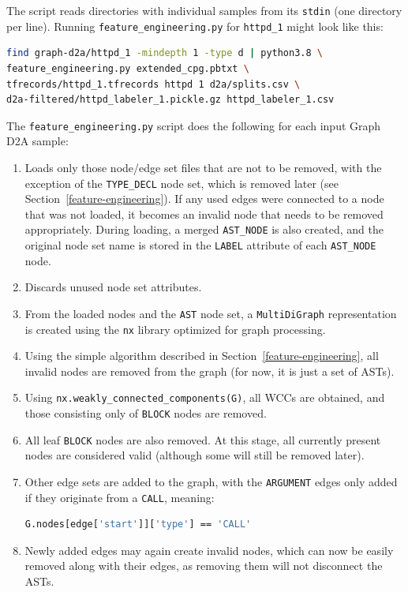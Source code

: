 The script reads directories with individual samples from its \texttt{stdin} (one directory per line). Running \texttt{feature\_engineering.py} for \texttt{httpd\_1} might look like this:
\begin{lstlisting}[language=bash, xleftmargin=2em]
find graph-d2a/httpd_1 -mindepth 1 -type d | python3.8 \
feature_engineering.py extended_cpg.pbtxt \
tfrecords/httpd_1.tfrecords httpd 1 d2a/splits.csv \
d2a-filtered/httpd_labeler_1.pickle.gz httpd_labeler_1.csv
\end{lstlisting}

The \texttt{feature\_engineering.py} script does the following for each input Graph D2A sample:
\begin{enumerate}
    \item Loads only those node/edge set files that are not to be removed, with the exception of the \texttt{TYPE\_DECL} node set, which is removed later (see Section~\ref{feature-engineering}). If any used edges were connected to a node that was not loaded, it becomes an invalid node that needs to be removed appropriately. During loading, a merged \texttt{AST\_NODE} is also created, and the original node set name is stored in the \texttt{LABEL} attribute of each \texttt{AST\_NODE} node.
    \item Discards unused node set attributes.
    \item From the loaded nodes and the \texttt{AST} node set, a \texttt{MultiDiGraph} representation is created using the \texttt{nx} library optimized for graph processing.
    \item Using the simple algorithm described in Section~\ref{feature-engineering}, all invalid nodes are removed from the graph (for now, it is just a set of ASTs).
    \item Using \texttt{nx.weakly\_connected\_components(G)}, all WCCs are obtained, and those consisting only of \texttt{BLOCK} nodes are removed.
    \item All leaf \texttt{BLOCK} nodes are also removed. At this stage, all currently present nodes are considered valid (although some will still be removed later).
    \item Other edge sets are added to the graph, with the \texttt{ARGUMENT} edges only added if they originate from a \texttt{CALL}, meaning:
\begin{lstlisting}[language=bash, xleftmargin=2em]
G.nodes[edge['start']]['type'] == 'CALL'
\end{lstlisting}
    \item Newly added edges may again create invalid nodes, which can now be easily removed along with their edges, as removing them will not disconnect the ASTs.

\end{enumerate}
